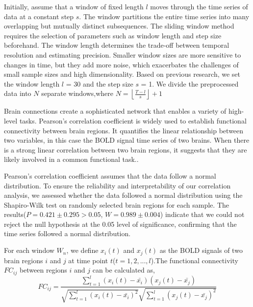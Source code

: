 \documentclass[journal,twoside,web]{ieeecolor}
\begin{document}
Initially, assume that a window of fixed length $l$ moves through the time series of data at a constant step $s$. The window partitions the entire time series into many overlapping but mutually distinct subsequences. The sliding window method requires the selection of parameters such as window length and step size beforehand. The window length determines the trade-off between temporal resolution and estimating precision\cite{savva2019assessment}. Smaller window sizes are more sensitive to changes in time, but they add more noise,  which exacerbates the challenges of small sample sizes and high dimensionality. Based on previous research, we set the window length $l$ = 30 and the step size $s$ = 1. We divide the preprocessed data into $N$ separate windows,where $N = \left \lfloor \frac{T - l}{s} \right \rfloor + 1$

Brain connections create a sophisticated network that enables a variety of high-level tasks. Pearson's correlation coefficient is widely used to establish functional connectivity between brain regions. It quantifies the linear relationship between two variables, in this case the BOLD signal time series of two brains. When there is a strong linear correlation between two brain regions, it suggests that they are likely involved in a common functional task.\cite{ju2017early}.

Pearson's correlation coefficient assumes that the data follow a normal distribution. To ensure the reliability and interpretability of our correlation analysis, we assessed whether the data followed a normal distribution using the Shapiro-Wilk test on randomly selected brain regions for each sample. The results($P=0.421\pm 0.295>0.05$, $W=0.989\pm 0.004$) indicate that we could not reject the null hypothesis at the 0.05 level of significance, confirming that the time series followed a normal distribution.

For each window $W_n$, we define $x_{i}(t)$ and $x_{j}(t)$ as the BOLD signals of two brain regions $i$ and $j$ at time point $t$($t = 1,2,...,l$).The functional connectivity $FC_{ij}$ between regions $i$ and $j$ can be calculated as,
\begin{equation}
	FC_{ij}=\frac{\sum_{t=1}^{l}(x_{i}(t)-\bar{x_{i}})(x_{j}(t)-\bar{x_{j}})}{\sqrt{\sum_{t=1}^{l}(x_{i}(t)-\bar{x_{i}})^2}\sqrt{\sum_{t=1}^{l}(x_{j}(t)-\bar{x_{j}})^2}}
\end{equation}
\end{document}
